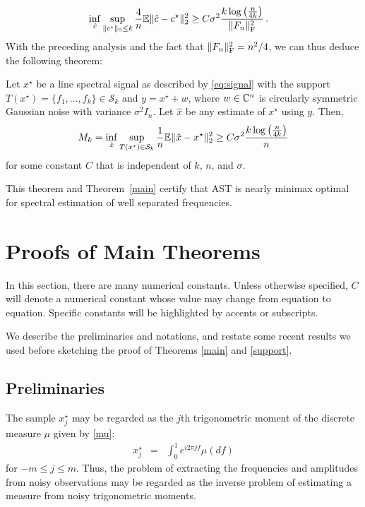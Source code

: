 \begin{align*}
\inf_{\hat{c}}
 \sup_{\lVert c^\star\rVert_0 \leq k} \frac{4}{n} \mathbb{E} \lVert\hat{c} - c^\star\rVert_2^2&\geq {C} \sigma^2 \frac{k \log\left(\frac{n}{4k}\right)}{\lVert F_n\rVert_\mathrm{F}^2}\,.
 \end{align*} With the preceding analysis and the fact that $\lVert F_n\rVert_{\mathrm{F}}^2 = n^2/4$, we can thus deduce the following theorem:
 \begin{theorem}
\label{minimax}
Let $x^\star$ be a line spectral signal as described by \eqref{eq:signal} with the support $T(x^\star) = \{f_1, \dots, f_k\} \in \mathcal{S}_k$ and $y = x^\star + w$, where $w \in \mathbb{C}^n$ is circularly symmetric Gaussian noise with variance $\sigma^2 I_n$. Let $\hat{x}$ be any estimate of $x^\star$ using $y$. Then,
\[
M_k = \inf_{\hat{x}}
 \sup_{
	T(x^\star) \in \mathcal{S}_k}
\frac{1}{n} \mathbb{E} \lVert\hat{x} - x^\star\rVert_2^2
\geq C\sigma^2 \frac{k \log\left(\frac{n}{4k}\right)}{n}
\]
for some constant $C$ that is independent of $k$, $n$, and $\sigma$.
\end{theorem}

This theorem and Theorem~\ref{main} certify that AST is nearly minimax optimal for spectral estimation of well separated frequencies. 



\section{Proofs of Main Theorems}
\label{sec:proofs}

In this section, there are many numerical constants.  Unless otherwise specified, $C$ will denote a numerical constant whose value may change from equation to equation.  Specific constants will be highlighted by accents or subscripts.

We describe the preliminaries and notations, and restate some recent results we used 
before sketching the proof of Theorems \ref{main} and \ref{support}.

\subsection{Preliminaries}
The sample $x^\star_j$ may be regarded as the $j$th trigonometric moment of 
the discrete measure $\mu$ given by \eqref{mu}:
\begin{eqnarray*}
  x_j^\star & = & \int_0^1 e^{i 2 \pi j f} \mu ( d f)
\end{eqnarray*}
for $-m \leq j \leq m$.
Thus, the problem of extracting the frequencies and amplitudes from noisy 
observations may be regarded as the inverse problem of estimating a measure 
from noisy trigonometric moments.


